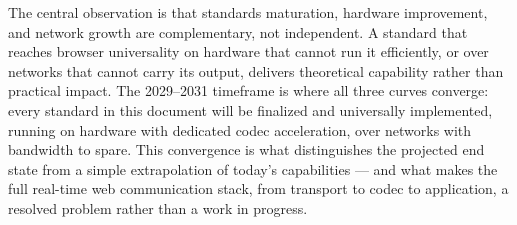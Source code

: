 \documentclass[11pt]{article}
\begin{document}
The central observation is that standards maturation, hardware improvement, and
network growth are complementary, not independent. A standard that reaches
browser universality on hardware that cannot run it efficiently, or over
networks that cannot carry its output, delivers theoretical capability rather
than practical impact. The 2029--2031 timeframe is where all three curves
converge: every standard in this document will be finalized and universally
implemented, running on hardware with dedicated codec acceleration, over
networks with bandwidth to spare. This convergence is what distinguishes the
projected end state from a simple extrapolation of today's capabilities ---
and what makes the full real-time web communication stack, from transport to
codec to application, a resolved problem rather than a work in progress.

\newpage
\appendix
\renewcommand{\thesection}{\Alph{section}}
\renewcommand{\thesubsection}{\Alph{section}.\arabic{subsection}}
\renewcommand{\thesubsubsection}{\Alph{section}.\arabic{subsection}.\arabic{subsubsection}}


\end{document}
